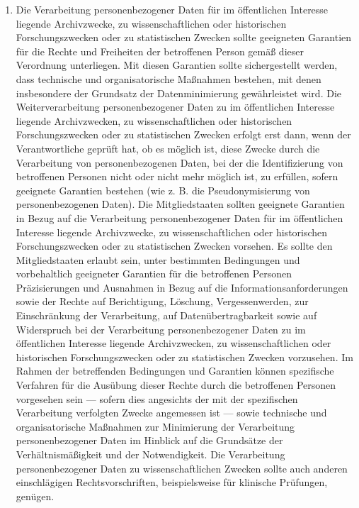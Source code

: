 \begin{enumerate}
   \item Die Verarbeitung personenbezogener Daten für im öffentlichen Interesse liegende Archivzwecke, zu
    wissenschaftlichen oder historischen Forschungszwecken oder zu statistischen Zwecken sollte geeigneten Garantien
    für die Rechte und Freiheiten der betroffenen Person gemäß dieser Verordnung unterliegen. Mit diesen Garantien
    sollte sichergestellt werden, dass technische und organisatorische Maßnahmen bestehen, mit denen insbesondere der
    Grundsatz der Datenminimierung gewährleistet wird. Die Weiterverarbeitung personenbezogener Daten zu im
    öffentlichen Interesse liegende Archivzwecken, zu wissenschaftlichen oder historischen Forschungszwecken oder zu
    statistischen Zwecken erfolgt erst dann, wenn der Verantwortliche geprüft hat, ob es möglich ist, diese Zwecke
    durch die Verarbeitung von personenbezogenen Daten, bei der die Identifizierung von betroffenen Personen nicht oder
    nicht mehr möglich ist, zu erfüllen, sofern geeignete Garantien bestehen (wie z. B. die Pseudonymisierung von
    personenbezogenen Daten). Die Mitgliedstaaten sollten geeignete Garantien in Bezug auf die Verarbeitung
    personenbezogener Daten für im öffentlichen Interesse liegende Archivzwecke, zu wissenschaftlichen oder
    historischen Forschungszwecken oder zu statistischen Zwecken vorsehen. Es sollte den Mitgliedstaaten erlaubt sein,
    unter bestimmten Bedingungen und vorbehaltlich geeigneter Garantien für die betroffenen Personen Präzisierungen und
    Ausnahmen in Bezug auf die Informationsanforderungen sowie der Rechte auf Berichtigung, Löschung, Vergessenwerden,
    zur Einschränkung der Verarbeitung, auf Datenübertragbarkeit sowie auf Widerspruch bei der Verarbeitung
    personenbezogener Daten zu im öffentlichen Interesse liegende Archivzwecken, zu wissenschaftlichen oder
    historischen Forschungszwecken oder zu statistischen Zwecken vorzusehen. Im Rahmen der betreffenden Bedingungen und
    Garantien können spezifische Verfahren für die Ausübung dieser Rechte durch die betroffenen Personen vorgesehen
    sein — sofern dies angesichts der mit der spezifischen Verarbeitung verfolgten Zwecke angemessen ist — sowie
    technische und organisatorische Maßnahmen zur Minimierung der Verarbeitung personenbezogener Daten im Hinblick auf
    die Grundsätze der Verhältnismäßigkeit und der Notwendigkeit. Die Verarbeitung personenbezogener Daten zu
    wissenschaftlichen Zwecken sollte auch anderen einschlägigen Rechtsvorschriften, beispielsweise für klinische
    Prüfungen, genügen.%
   \label{itm:eg-156}
   

\end{enumerate}
